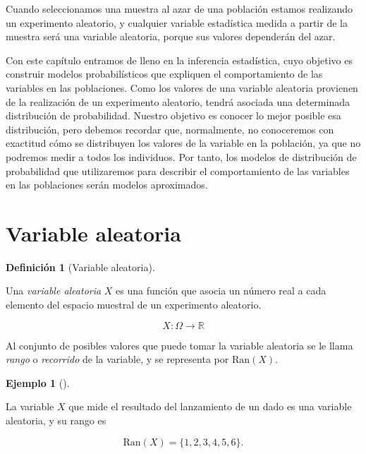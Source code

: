 \documentclass[
  spanish,
  a4paper,
]{scrreport}
\theoremstyle{plain}
\theoremstyle{definition}
\newtheorem{example}{Ejemplo}[chapter]
\theoremstyle{definition}
\newtheorem{definition}{Definición}[chapter]
\theoremstyle{remark}
\begin{document}
Cuando seleccionamos una muestra al azar de una población estamos
realizando un experimento aleatorio, y cualquier variable estadística
medida a partir de la muestra será una variable aleatoria, porque sus
valores dependerán del azar.

Con este capítulo entramos de lleno en la inferencia estadística, cuyo
objetivo es construir modelos probabilísticos que expliquen el
comportamiento de las variables en las poblaciones. Como los valores de
una variable aleatoria provienen de la realización de un experimento
aleatorio, tendrá asociada una determinada distribución de probabilidad.
Nuestro objetivo es conocer lo mejor posible esa distribución, pero
debemos recordar que, normalmente, no conoceremos con exactitud cómo se
distribuyen los valores de la variable en la población, ya que no
podremos medir a todos los individuos. Por tanto, los modelos de
distribución de probabilidad que utilizaremos para describir el
comportamiento de las variables en las poblaciones serán modelos
aproximados.

\section{Variable aleatoria}\label{variable-aleatoria}

\begin{definition}[Variable
aleatoria]\protect\hypertarget{def-variable-aleatoria}{}\label{def-variable-aleatoria}

Una \emph{variable aleatoria} \(X\) es una función que asocia un número
real a cada elemento del espacio muestral de un experimento aleatorio.

\[
X:\Omega \rightarrow \mathbb{R}
\]

Al conjunto de posibles valores que puede tomar la variable aleatoria se
le llama \emph{rango} o \emph{recorrido} de la variable, y se representa
por \(\mbox{Ran}(X)\).

\end{definition}

\begin{example}[]\protect\hypertarget{exm-variable-aleatoria-dado}{}\label{exm-variable-aleatoria-dado}

La variable \(X\) que mide el resultado del lanzamiento de un dado es
una variable aleatoria, y su rango es

\[
\mbox{Ran}(X)=\{1,2,3,4,5,6\}.
\]

\end{example}
\end{document}
